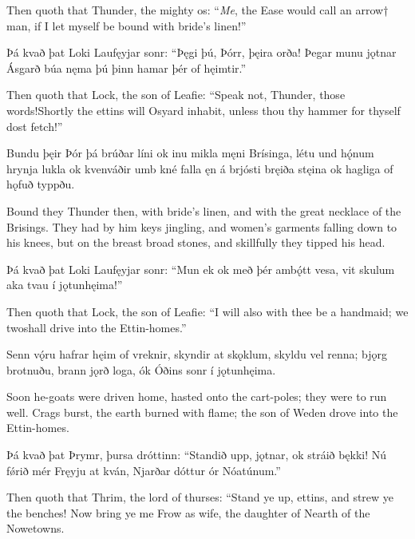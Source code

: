 Then quoth that Thunder, the mighty os: “\emph{Me}, the Ease would call an arrow† man, if I let myself be bound with bride’s linen!”

Þá kvað þat Loki \hld Laufęyjar sonr:
“Þęgi þú, Þórr, \hld þęira orða!
Þegar munu jǫtnar \hld Ásgarð búa
nęma þú þinn hamar \hld þér of hęimtir.”

Then quoth that Lock, the son of Leafie: “Speak not, Thunder, those words!\footnotemark[1] Shortly the ettins will Osyard inhabit, unless thou thy hammer for thyself dost fetch!”

Bundu þęir Þór þá \hld brúðar líni
ok inu mikla \hld męni Brísinga,
létu und hǫ́num \hld hrynja lukla
ok kvenváðir \hld umb kné falla
ęn á brjósti \hld bręiða stęina
ok hagliga \hld of hǫfuð typpðu.

Bound they Thunder then, with bride’s linen, and with the great necklace of the Brisings. They had by him keys jingling, and women’s garments falling down to his knees, but on the breast broad stones, and skillfully they tipped his head.

Þá kvað þat Loki \hld Laufęyjar sonr:
“Mun ek ok með þér \hld ambǫ́tt vesa,
vit skulum aka tvau \hld í jǫtunhęima!”

Then quoth that Lock, the son of Leafie: “I will also with thee be a handmaid; we two\footnotemark[1] shall drive into the Ettin-homes.”

Senn vǫ́ru hafrar \hld hęim of vreknir,
skyndir at skǫklum, \hld skyldu vel renna;
bjǫrg brotnuðu, \hld brann jǫrð loga,
ók Óðins sonr \hld í jǫtunhęima.

Soon he-goats were driven home, hasted onto the cart-poles; they were to run well. Crags burst, the earth burned with flame; the son of Weden drove into the Ettin-homes.\footnotemark[1]

Þá kvað þat Þrymr, \hld þursa dróttinn:
“Standið upp, jǫtnar, \hld ok stráið bękki!
Nú fǿrið mér \hld Fręyju at kván,
Njarðar dóttur \hld ór Nóatúnum.”

Then quoth that Thrim, the lord of thurses: “Stand ye up, ettins, and strew ye the benches! Now bring ye me Frow as wife, the daughter of Nearth of the Nowetowns.

